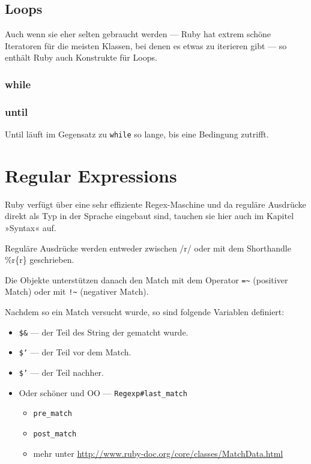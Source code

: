 \documentclass[a4book,11pt,twoside]{scrbook}
\begin{document}




\subsection*{Loops} %
\label{sub:loops}
Auch wenn sie eher selten gebraucht werden — Ruby hat extrem schöne Iteratoren für die meisten Klassen, bei denen es etwas zu iterieren gibt — so enthält Ruby auch Konstrukte für Loops.

\subsubsection*{while} %
\label{ssub:while}


\subsubsection{until} %
\label{ssub:until}
Until läuft im Gegensatz zu \texttt{while} so lange, bis eine Bedingung zutrifft.





\section{Regular Expressions} %
\label{sec:regular_expressions}
Ruby verfügt über eine sehr effiziente Regex-Maschine und da reguläre Ausdrücke direkt als Typ in der Sprache eingebaut sind, tauchen sie hier auch im Kapitel »Syntax« auf.

Reguläre Ausdrücke werden entweder zwischen /r/ oder mit dem Shorthandle \%r\{r\} geschrieben.



Die Objekte unterstützen danach den Match mit dem Operator \lstinline{=~} (positiver Match) oder mit \lstinline{!~} (negativer Match).

Nachdem so ein Match versucht wurde, so sind folgende Variablen definiert:

\begin{itemize}
	\item \texttt{\$\&} — der Teil des String der gematcht wurde.
	\item \texttt{\$`} — der Teil vor dem Match.
	\item \texttt{\$'} — der Teil nachher.
	\item Oder schöner und OO — \texttt{Regexp\#last\_match}
	\begin{itemize}
		\item \texttt{pre\_match}
		\item \texttt{post\_match}
		\item mehr unter \url{http://www.ruby-doc.org/core/classes/MatchData.html}
	\end{itemize}
\end{itemize}
\end{document}
